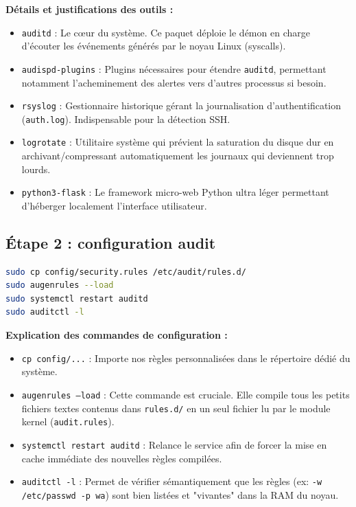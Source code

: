 \documentclass[12pt,a4paper]{article}
\begin{document}
\textbf{Détails et justifications des outils :}
\begin{itemize}
    \item \texttt{auditd} : Le cœur du système. Ce paquet déploie le démon en charge d'écouter les événements générés par le noyau Linux (syscalls).
    \item \texttt{audispd-plugins} : Plugins nécessaires pour étendre \texttt{auditd}, permettant notamment l'acheminement des alertes vers d'autres processus si besoin.
    \item \texttt{rsyslog} : Gestionnaire historique gérant la journalisation d'authentification (\texttt{auth.log}). Indispensable pour la détection SSH.
    \item \texttt{logrotate} : Utilitaire système qui prévient la saturation du disque dur en archivant/compressant automatiquement les journaux qui deviennent trop lourds.
    \item \texttt{python3-flask} : Le framework micro-web Python ultra léger permettant d'héberger localement l'interface utilisateur.
\end{itemize}

\subsection{Étape 2 : configuration audit}

\begin{lstlisting}[language=bash]
sudo cp config/security.rules /etc/audit/rules.d/
sudo augenrules --load
sudo systemctl restart auditd
sudo auditctl -l
\end{lstlisting}

\textbf{Explication des commandes de configuration :}
\begin{itemize}
    \item \texttt{cp config/...} : Importe nos règles personnalisées dans le répertoire dédié du système.
    \item \texttt{augenrules --load} : Cette commande est cruciale. Elle compile tous les petits fichiers textes contenus dans \texttt{rules.d/} en un seul fichier lu par le module kernel (\texttt{audit.rules}).
    \item \texttt{systemctl restart auditd} : Relance le service afin de forcer la mise en cache immédiate des nouvelles règles compilées.
    \item \texttt{auditctl -l} : Permet de vérifier sémantiquement que les règles (ex: \texttt{-w /etc/passwd -p wa}) sont bien listées et "vivantes" dans la RAM du noyau.
\end{itemize}
\end{document}
